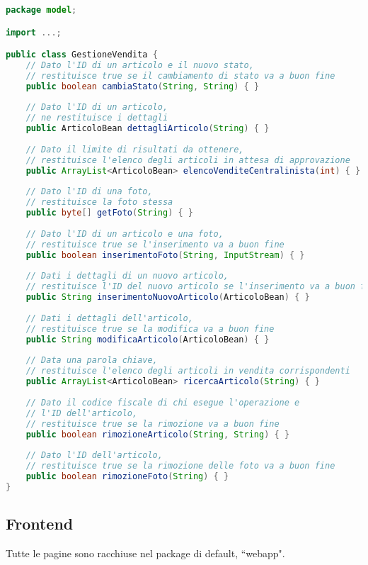 \documentclass[12pt,a4paper]{article}
\begin{document}
\begin{lstlisting}[language=Java]
package model;

import ...;

public class GestioneVendita {
	// Dato l'ID di un articolo e il nuovo stato, 
	// restituisce true se il cambiamento di stato va a buon fine
	public boolean cambiaStato(String, String) { }
	
	// Dato l'ID di un articolo,
	// ne restituisce i dettagli
	public ArticoloBean dettagliArticolo(String) { }
	
	// Dato il limite di risultati da ottenere,
	// restituisce l'elenco degli articoli in attesa di approvazione
	public ArrayList<ArticoloBean> elencoVenditeCentralinista(int) { }
	
	// Dato l'ID di una foto,
	// restituisce la foto stessa
	public byte[] getFoto(String) { }
	
	// Dato l'ID di un articolo e una foto,
	// restituisce true se l'inserimento va a buon fine
	public boolean inserimentoFoto(String, InputStream) { }
	
	// Dati i dettagli di un nuovo articolo,
	// restituisce l'ID del nuovo articolo se l'inserimento va a buon fine
	public String inserimentoNuovoArticolo(ArticoloBean) { }
	
	// Dati i dettagli dell'articolo,
	// restituisce true se la modifica va a buon fine
	public String modificaArticolo(ArticoloBean) { }
	
	// Data una parola chiave,
	// restituisce l'elenco degli articoli in vendita corrispondenti
	public ArrayList<ArticoloBean> ricercaArticolo(String) { }
	
	// Dato il codice fiscale di chi esegue l'operazione e
	// l'ID dell'articolo,
	// restituisce true se la rimozione va a buon fine
	public boolean rimozioneArticolo(String, String) { }
	
	// Dato l'ID dell'articolo,
	// restituisce true se la rimozione delle foto va a buon fine
	public boolean rimozioneFoto(String) { }
}
\end{lstlisting}


\newpage

\subsection{Frontend}
Tutte le pagine sono racchiuse nel package di default, ``webapp".
\end{document}
